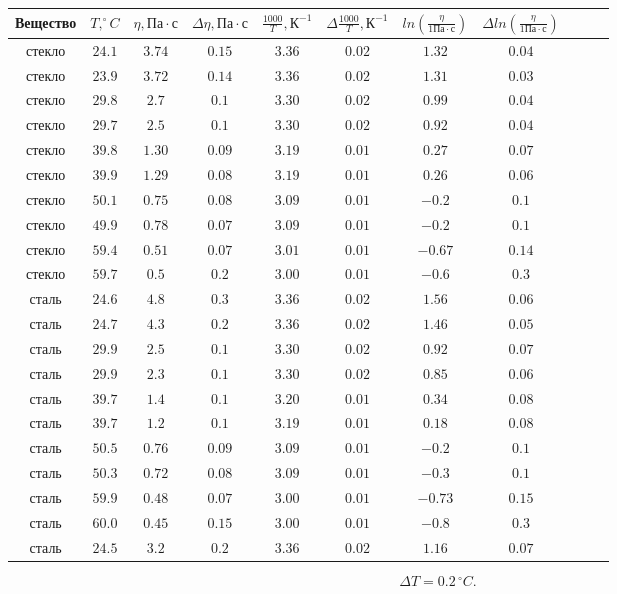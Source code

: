 \begin{center}
\begin{tabular}{|c|c|c|c|c|c|c|c|c|c|c|}\hline
Вещество&$T, ^\circ C$&$\eta, \text{Па} \cdot \text{с}$&$\Delta \eta, \text{Па} \cdot \text{с}$
&$\frac{1000}{T}, \text{К}^{-1}$&$\Delta \frac{1000}{T}, \text{К}^{-1}$
&$ln(\frac{\eta} {1 \text{Па} \cdot \text{с}})$&$\Delta ln(\frac{\eta} {1 \text{Па} \cdot \text{с}})$
\\ \hline
стекло&$24.1$&$3.74$&$0.15$&$3.36$&$0.02$&$1.32$&$0.04$\\ \hline
стекло&$23.9$&$3.72$&$0.14$&$3.36$&$0.02$&$1.31$&$0.03$\\ \hline
стекло&$29.8$&$2.7$&$0.1$&$3.30$&$0.02$&$0.99$&$0.04$\\ \hline
стекло&$29.7$&$2.5$&$0.1$&$3.30$&$0.02$&$0.92$&$0.04$\\ \hline
стекло&$39.8$&$1.30$&$0.09$&$3.19$&$0.01$&$0.27$&$0.07$\\ \hline
стекло&$39.9$&$1.29$&$0.08$&$3.19$&$0.01$&$0.26$&$0.06$\\ \hline
стекло&$50.1$&$0.75$&$0.08$&$3.09$&$0.01$&$-0.2$&$0.1$\\ \hline
стекло&$49.9$&$0.78$&$0.07$&$3.09$&$0.01$&$-0.2$&$0.1$\\ \hline
стекло&$59.4$&$0.51$&$0.07$&$3.01$&$0.01$&$-0.67$&$0.14$\\ \hline
стекло&$59.7$&$0.5$&$0.2$&$3.00$&$0.01$&$-0.6$&$0.3$\\ \hline
сталь&$24.6$&$4.8$&$0.3$&$3.36$&$0.02$&$1.56$&$0.06$\\ \hline
сталь&$24.7$&$4.3$&$0.2$&$3.36$&$0.02$&$1.46$&$0.05$\\ \hline
сталь&$29.9$&$2.5$&$0.1$&$3.30$&$0.02$&$0.92$&$0.07$\\ \hline
сталь&$29.9$&$2.3$&$0.1$&$3.30$&$0.02$&$0.85$&$0.06$\\ \hline
сталь&$39.7$&$1.4$&$0.1$&$3.20$&$0.01$&$0.34$&$0.08$\\ \hline
сталь&$39.7$&$1.2$&$0.1$&$3.19$&$0.01$&$0.18$&$0.08$\\ \hline
сталь&$50.5$&$0.76$&$0.09$&$3.09$&$0.01$&$-0.2$&$0.1$\\ \hline
сталь&$50.3$&$0.72$&$0.08$&$3.09$&$0.01$&$-0.3$&$0.1$\\ \hline
сталь&$59.9$&$0.48$&$0.07$&$3.00$&$0.01$&$-0.73$&$0.15$\\ \hline
сталь&$60.0$&$0.45$&$0.15$&$3.00$&$0.01$&$-0.8$&$0.3$\\ \hline
сталь&$24.5$&$3.2$&$0.2$&$3.36$&$0.02$&$1.16$&$0.07$\\ \hline
\end{tabular}
\end{center}
$$\Delta T=0.2\, ^\circ C.$$

